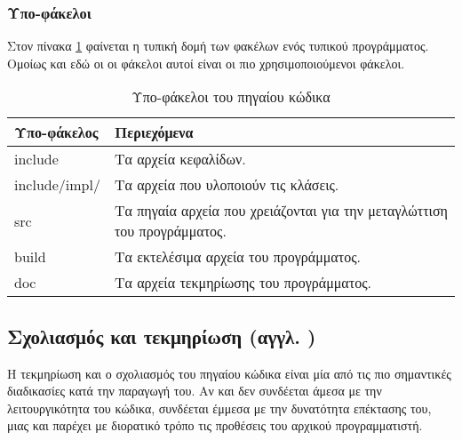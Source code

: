 \clearpage

\subsubsection{Υπο-φάκελοι}

Στον πίνακα \ref{table:subfolders} φαίνεται η τυπική δομή των φακέλων ενός τυπικού προγράμματος. Ομοίως και εδώ οι οι φάκελοι αυτοί είναι οι πιο χρησιμοποιούμενοι φάκελοι.

\begin{table}[htbp]
\begin{center}
\begin{tabular}{|m{}|m{}|}
\hline
Υπο-φάκελος   & Περιεχόμενα 	                         \\ \hline
include       & Τα αρχεία κεφαλίδων.                     \\ \hline
include/impl/ & Τα αρχεία που υλοποιούν τις κλάσεις.     \\ \hline
src 	      & Τα πηγαία αρχεία που χρειάζονται για 
                την μεταγλώττιση του προγράμματος.       \\ \hline
build 	      & Τα εκτελέσιμα αρχεία του προγράμματος.   \\ \hline
doc 	      & Τα αρχεία τεκμηρίωσης του προγράμματος.  \\ \hline

\end{tabular}
\end{center}
\caption[Υπο-φάκελοι του πηγαίου κώδικα]{Υπο-φάκελοι του πηγαίου κώδικα \cite{site:boost_guidelines,site:pcl}}
\label{table:subfolders}
\end{table}


\subsection[Σχολιασμός και τεκμηρίωση]{Σχολιασμός και τεκμηρίωση (αγγλ. )\cite{wikibook:cpp_style}}

Η τεκμηρίωση και ο σχολιασμός του πηγαίου κώδικα είναι μία από τις πιο σημαντικές διαδικασίες κατά την παραγωγή του. Αν και δεν συνδέεται άμεσα με την λειτουργικότητα του κώδικα, συνδέεται έμμεσα με την δυνατότητα επέκτασης του, μιας και παρέχει με διορατικό τρόπο τις προθέσεις του αρχικού προγραμματιστή. %

